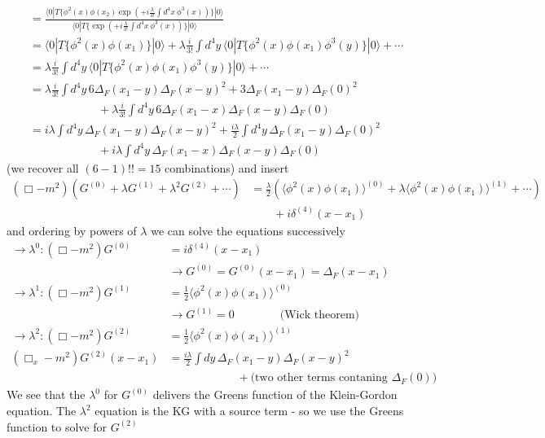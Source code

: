 \documentclass[10pt,a4paper]{article}
\theoremstyle{definition}
\begin{document}
\begin{enumerate}[1.]
\begin{align}
&=\frac{\langle0| T\{\phi^2(x)\phi(x_2)\exp(+i\frac{\lambda}{3!}\int d^4x\,\phi^3(x))\}|0\rangle}{\langle0| T\{\exp(+i\frac{\lambda}{3!}\int d^4x\,\phi^3(x))\}|0\rangle}\\
& = \langle0|T\{\phi^2(x)\phi(x_1)\}|0\rangle+\lambda\frac{i}{3!}\int d^4y\,\langle0|T\{\phi^2(x)\phi(x_1)\phi^3(y)\}|0\rangle+\cdots\\
&=\lambda\frac{i}{3!}\int d^4y\,\langle0|T\{\phi^2(x)\phi(x_1)\phi^3(y)\}|0\rangle+\cdots\\
&=\lambda\frac{i}{3!}\int d^4y\,
6\Delta_F(x_1-y)\Delta_F(x-y)^2
+3\Delta_F(x_1-y)\Delta_F(0)^2\\
&\qquad\qquad\qquad
+\lambda\frac{i}{3!}\int d^4y\,6\Delta_F(x_1-x)\Delta_F(x-y)\Delta_F(0)\\
&=
i\lambda\int d^4y\,\Delta_F(x_1-y)\Delta_F(x-y)^2
+\frac{i\lambda}{2}\int d^4y\,\Delta_F(x_1-y)\Delta_F(0)^2\\
&\qquad\qquad\qquad
+i\lambda\int d^4y\,\Delta_F(x_1-x)\Delta_F(x-y)\Delta_F(0)
\end{align}
(we recover all $(6-1)!!=15$ combinations) and insert
\begin{align}
(\Box-m^2)(G^{(0)} + \lambda G^{(1)} + \lambda^2 G^{(2)} + \cdots)&=
\frac{\lambda}{2}\left(\langle\phi^2(x)\phi(x_1)\rangle^{(0)}+\lambda\langle\phi^2(x)\phi(x_1)\rangle^{(1)}+ \cdots\right)\\
&\qquad+i\delta^{(4)}(x-x_1)
\end{align}
and ordering by powers of $\lambda$ we can solve the equations successively 
\begin{align}
\rightarrow \lambda^0:(\Box-m^2)G^{(0)}&=i\delta^{(4)}(x-x_1)\\
&\rightarrow G^{(0)}=G^{(0)}(x-x_1)=\Delta_F(x-x_1)\\
\rightarrow \lambda^1:(\Box-m^2)G^{(1)}&=\frac{1}{2}\langle\phi^2(x)\phi(x_1)\rangle^{(0)}\\
&\rightarrow G^{(1)}=0\qquad\qquad\text{(Wick theorem)}\\
\rightarrow \lambda^2:(\Box-m^2)G^{(2)}
&=\frac{1}{2}\langle\phi^2(x)\phi(x_1)\rangle^{(1)}\\
(\Box_x-m^2)G^{(2)}(x-x_1)
&=\frac{i\lambda}{2}\int dy\,\Delta_F(x_1-y)\Delta_F(x-y)^2\\
&\qquad\qquad\qquad+\text{(two other terms contaning $\Delta_F(0)$)}
\end{align}
We see that the $\lambda^0$ for $G^{(0)}$ delivers the Greens function of the Klein-Gordon equation. The $\lambda^2$ equation is the KG with a source term - so we use the Greens function to solve for $G^{(2)}$

\end{enumerate}
\end{document}
